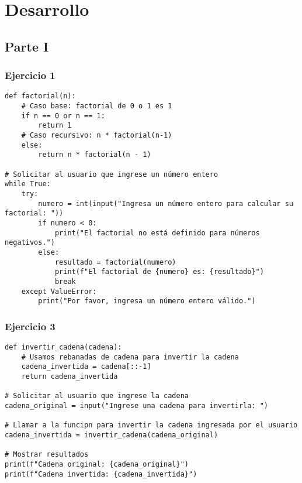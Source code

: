 \documentclass[10pt,a4paper]{article}
\begin{document}
\section{Desarrollo}
\subsection{Parte I}

\subsubsection{Ejercicio 1}
\begin{lstlisting}
def factorial(n):
    # Caso base: factorial de 0 o 1 es 1
    if n == 0 or n == 1:
        return 1
    # Caso recursivo: n * factorial(n-1)
    else:
        return n * factorial(n - 1)

# Solicitar al usuario que ingrese un número entero
while True:
    try:
        numero = int(input("Ingresa un número entero para calcular su factorial: "))
        if numero < 0:
            print("El factorial no está definido para números negativos.")
        else:
            resultado = factorial(numero)
            print(f"El factorial de {numero} es: {resultado}")
            break
    except ValueError:
        print("Por favor, ingresa un número entero válido.")  

\end{lstlisting}



\subsubsection{Ejercicio 3}
\begin{lstlisting}
def invertir_cadena(cadena):
    # Usamos rebanadas de cadena para invertir la cadena
    cadena_invertida = cadena[::-1]
    return cadena_invertida

# Solicitar al usuario que ingrese la cadena
cadena_original = input("Ingrese una cadena para invertirla: ")

# Llamar a la funcipn para invertir la cadena ingresada por el usuario
cadena_invertida = invertir_cadena(cadena_original)

# Mostrar resultados
print(f"Cadena original: {cadena_original}")
print(f"Cadena invertida: {cadena_invertida}")

\end{lstlisting}
\end{document}
